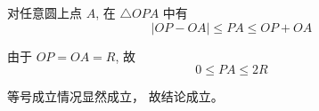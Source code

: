 \begin{proofbox}
对任意圆上点 $A$,
在 $\triangle OPA$ 中有
\[
|OP-OA| \le PA \le OP+OA
\]

由于 $OP=OA=R$,
故
\[
0 \le PA \le 2R
\]

等号成立情况显然成立，
故结论成立。
\end{proofbox}
